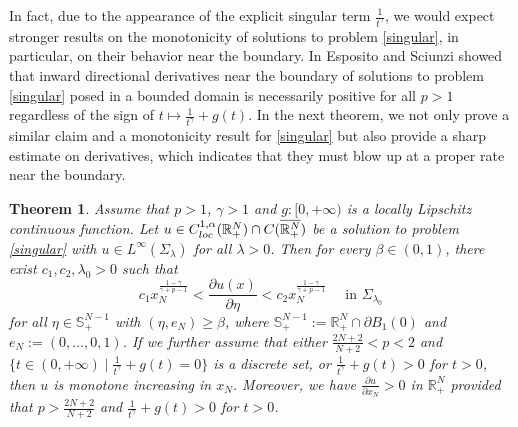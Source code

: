 \documentclass[reqno]{amsart}
\theoremstyle{plain}
\newtheorem{theorem}{Theorem}
\theoremstyle{definition}
\theoremstyle{remark}
\begin{document}
	In fact, due to the appearance of the explicit singular term $\frac{1}{t^\gamma}$, we would expect stronger results on the monotonicity of solutions to problem \eqref{singular}, in particular, on their behavior near the boundary. In \cite{MR4044739} Esposito and Sciunzi showed that inward directional derivatives near the boundary of solutions to problem \eqref{singular} posed in a bounded domain is necessarily positive for all $p>1$ regardless of the sign of $t\mapsto\frac{1}{t^\gamma} + g(t)$. In the next theorem, we not only prove a similar claim and a monotonicity result for \eqref{singular} but also provide a sharp estimate on derivatives, which indicates that they must blow up at a proper rate near the boundary.
	\begin{theorem}\label{th:monotonicity2} Assume that $p>1$, $\gamma>1$ and $g:[0,+\infty)$ is a locally Lipschitz continuous function.
		Let $u \in C^{1,\alpha}_{\rm loc}(\mathbb{R}^N_+) \cap C(\overline{\mathbb{R}^N_+})$ be a solution to problem \eqref{singular} with $u\in L^\infty(\Sigma_\lambda)$ for all $\lambda>0$. Then for every $\beta\in(0,1)$, there exist $c_1,c_2,\lambda_0>0$ such that
		\begin{equation}\label{gradient_blowup}
			c_1 x_N^{\frac{1-\gamma}{\gamma+p-1}} < \frac{\partial u(x)}{\partial \eta} < c_2 x_N^{\frac{1-\gamma}{\gamma+p-1}} \quad\text{ in } \Sigma_{\lambda_0}
		\end{equation}
		for all $\eta\in \mathbb{S}^{N-1}_+$ with $(\eta,e_N) \ge \beta$, where $\mathbb{S}^{N-1}_+:=\mathbb{R}^N_+ \cap \partial B_1(0)$ and $e_N:=(0,\dots,0,1)$. If we further assume that either $\frac{2N+2}{N+2} < p < 2$ and $\{t\in(0,+\infty) \mid \frac{1}{t^\gamma} + g(t)=0\}$ is a discrete set, or $\frac{1}{t^\gamma} + g(t)>0$ for $t>0$, then $u$ is monotone increasing in $x_N$. Moreover, we have $\frac{\partial u}{\partial x_N} > 0$ in $\mathbb{R}^N_+$ provided that $p>\frac{2N+2}{N+2}$ and $\frac{1}{t^\gamma} + g(t)>0$ for $t>0$.
	\end{theorem}
	
\end{document}
